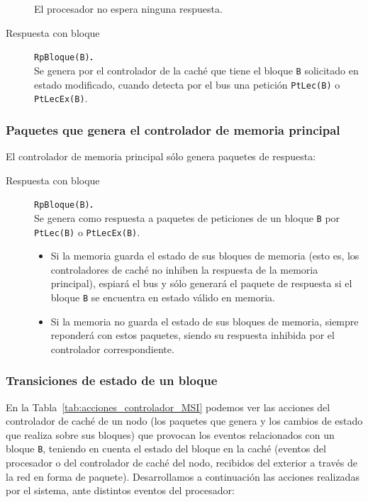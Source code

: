 \begin{description}
        El procesador no espera ninguna respuesta.
        

    \item [Respuesta con bloque] \verb|RpBloque(B)|\textbf{.}~\\
        Se genera por el controlador de la caché que tiene el bloque \verb|B| solicitado en estado modificado, cuando detecta por el bus una petición \verb|PtLec(B)| o \verb|PtLecEx(B)|.
\end{description}

\subsubsection{Paquetes que genera el controlador de memoria principal}
El controlador de memoria principal sólo genera paquetes de respuesta:
\begin{description}
    \item [Respuesta con bloque] \verb|RpBloque(B)|\textbf{.}~\\
        Se genera como respuesta a paquetes de peticiones de un bloque \verb|B| por \verb|PtLec(B)| o \verb|PtLecEx(B)|.

        \begin{itemize}
            \item Si la memoria guarda el estado de sus bloques de memoria (esto es, los controladores de caché no inhiben la respuesta de la memoria principal), espiará el bus y sólo generará el paquete de respuesta si el bloque \verb|B| se encuentra en estado válido en memoria.
            \item Si la memoria no guarda el estado de sus bloques de memoria, siempre reponderá con estos paquetes, siendo su respuesta inhibida por el controlador correspondiente.
        \end{itemize}
\end{description}

\subsubsection{Transiciones de estado de un bloque}
En la Tabla~\ref{tab:acciones_controlador_MSI} podemos ver las acciones del controlador de caché de un nodo (los paquetes que genera y los cambios de estado que realiza sobre sus bloques) que provocan los eventos relacionados con un bloque \verb|B|, teniendo en cuenta el estado del bloque en la caché (eventos del procesador o del controlador de caché del nodo, recibidos del exterior a través de la red en forma de paquete). Desarrollamos a continuación las acciones realizadas por el sistema, ante distintos eventos del procesador:

